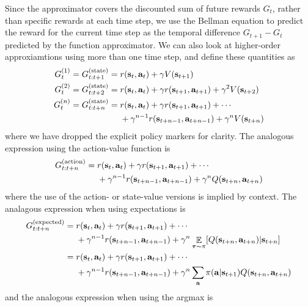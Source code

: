 \documentclass{article}
\begin{document}
Since the approximator covers the discounted sum of future rewards $G_t$, rather than specific rewards at each time step, we use the Bellman equation to predict the reward for the current time step as the temporal difference $G_{t+1}-G_t$ predicted by the function approximator. We can also look at higher-order approxiamtions using more than one time step, and define these quantities as \begin{equation}\begin{split}
G_t^{(1)}=G_{t:t+1}^\text{(state)}&=r(\mathbf{s}_t,\mathbf{a}_t)+\gamma V (\mathbf{s}_{t+1})\\G_t^{(2)}=G_{t:t+2}^\text{(state)}&=r(\mathbf{s}_t,\mathbf{a}_t)+\gamma r(\mathbf{s}_{t+1},\mathbf{a}_{t+1})+\gamma^2 V (\mathbf{s}_{t+2})\\G_t^{(n)}=G_{t:t+n}^\text{(state)}&=r(\mathbf{s}_t,\mathbf{a}_t)+\gamma r(\mathbf{s}_{t+1},\mathbf{a}_{t+1})+\cdots\\&\nobreakspace\nobreakspace\nobreakspace\nobreakspace+\gamma^{n-1}r(\mathbf{s}_{t+n-1},\mathbf{a}_{t+n-1})+\gamma^n V (\mathbf{s}_{t+n})\end{split}\end{equation} where we have dropped the explicit policy markers for clarity.  The analogous expression using the action-value function is \begin{equation}\begin{split}G_{t:t+n}^\text{(action)}&=r(\mathbf{s}_t,\mathbf{a}_t)+\gamma r(\mathbf{s}_{t+1},\mathbf{a}_{t+1})+\cdots\\&\nobreakspace\nobreakspace\nobreakspace\nobreakspace+\gamma^{n-1}r(\mathbf{s}_{t+n-1},\mathbf{a}_{t+n-1})+\gamma^n Q (\mathbf{s}_{t+n},\mathbf{a}_{t+n})\end{split}\end{equation} where the use of the action- or state-value versions is implied by context. The analagous expression when using expectations is \begin{equation}\begin{split}
G_{t:t+n}^{(\text{expected})}&=r(\mathbf{s}_t,\mathbf{a}_t)+\gamma r(\mathbf{s}_{t+1},\mathbf{a}_{t+1})+\cdots\\&\nobreakspace\nobreakspace\nobreakspace\nobreakspace+\gamma^{n-1}r(\mathbf{s}_{t+n-1},\mathbf{a}_{t+n-1})+\gamma^n \mathop{\mathbb{E}}_{\boldsymbol{\tau}\sim\pi}[Q (\mathbf{s}_{t+n},\mathbf{a}_{t+n})|\mathbf{s}_{t+n}]\\&=r(\mathbf{s}_t,\mathbf{a}_t)+\gamma r(\mathbf{s}_{t+1},\mathbf{a}_{t+1})+\cdots\\&\nobreakspace\nobreakspace\nobreakspace\nobreakspace+\gamma^{n-1}r(\mathbf{s}_{t+n-1},\mathbf{a}_{t+n-1})+\gamma^n \sum_\mathbf{a}\pi(\mathbf{a}|\mathbf{s}_{t+1})Q (\mathbf{s}_{t+n},\mathbf{a}_{t+n})\\\end{split}\end{equation} and the analogous expression when using the argmax is \begin{equation}\begin{split}

\end{split}
\end{equation}
\end{document}
